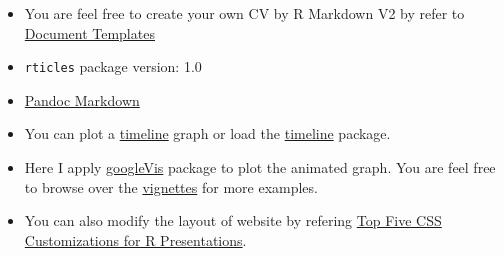 \documentclass[]{article}
\providecommand{\tightlist}{%
  \setlength{\itemsep}{0pt}\setlength{\parskip}{0pt}}
\begin{document}
\begin{itemize}
\tightlist
\item
  You are feel free to create your own CV by R Markdown V2 by refer to
  \href{http://rmarkdown.rstudio.com/developer_document_templates.html?version=0.99.484\&mode=server}{Document
  Templates}
\item
  \texttt{rticles} package version: 1.0
\item
  \href{http://rmarkdown.rstudio.com/authoring_pandoc_markdown.html}{Pandoc
  Markdown}
\item
  You can plot a
  \href{http://stackoverflow.com/questions/20695311/chronological-timeline-with-points-in-time-and-format-date}{timeline}
  graph or load the \href{http://jason.bryer.org/timeline/}{timeline}
  package.
\item
  Here I apply
  \href{https://cran.r-project.org/web/packages/googleVis/vignettes/Using_googleVis_with_knitr.html}{googleVis}
  package to plot the animated graph. You are feel free to browse over
  the
  \href{https://cran.r-project.org/web/packages/googleVis/vignettes/googleVis.pdf}{vignettes}
  for more examples.
\item
  You can also modify the layout of website by refering
  \href{http://rstudio-pubs-static.s3.amazonaws.com/27777_55697c3a476640caa0ad2099fe914ae5.html\#/}{Top
  Five CSS Customizations for R Presentations}.
\end{itemize}
\end{document}

